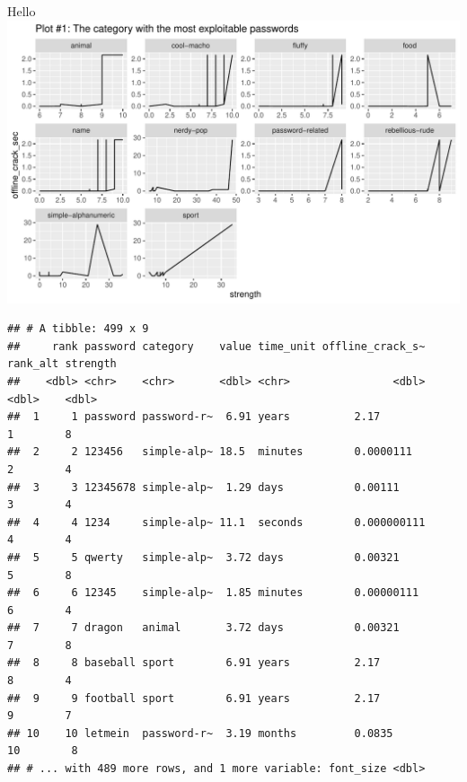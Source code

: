\documentclass[10pt,ignorenonframetext,aspectratio=169]{beamer}
\begin{document}
\begin{frame}[fragile]{Hello}
\protect\hypertarget{hello}{}
\includegraphics{Untitled_files/figure-beamer/p1d-1.pdf}

\begin{verbatim}
## # A tibble: 499 x 9
##     rank password category    value time_unit offline_crack_s~ rank_alt strength
##    <dbl> <chr>    <chr>       <dbl> <chr>                <dbl>    <dbl>    <dbl>
##  1     1 password password-r~  6.91 years          2.17               1        8
##  2     2 123456   simple-alp~ 18.5  minutes        0.0000111          2        4
##  3     3 12345678 simple-alp~  1.29 days           0.00111            3        4
##  4     4 1234     simple-alp~ 11.1  seconds        0.000000111        4        4
##  5     5 qwerty   simple-alp~  3.72 days           0.00321            5        8
##  6     6 12345    simple-alp~  1.85 minutes        0.00000111         6        4
##  7     7 dragon   animal       3.72 days           0.00321            7        8
##  8     8 baseball sport        6.91 years          2.17               8        4
##  9     9 football sport        6.91 years          2.17               9        7
## 10    10 letmein  password-r~  3.19 months         0.0835            10        8
## # ... with 489 more rows, and 1 more variable: font_size <dbl>
\end{verbatim}
\end{frame}
\end{document}
